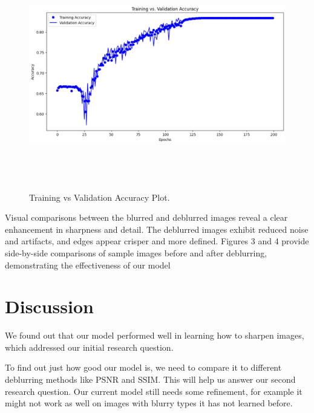 \documentclass[conference]{IEEEtran}
\begin{document}
\begin{figure}[t!]
\centering
\includegraphics[width=17cm,height=10cm]{Figures/Figure5.png}
\caption{Training vs Validation Accuracy Plot.}
\label{Fig:Figure5}
\end{figure}
Visual comparisons between the blurred and deblurred images reveal a clear enhancement in sharpness and detail.
The deblurred images exhibit reduced noise and artifacts, and edges appear crisper and more defined. Figures 3 and 4 provide side-by-side comparisons of sample images before and after deblurring, demonstrating the effectiveness of our model

\section{Discussion}

We found out that our model performed well in learning how to sharpen images, which addressed our initial research question. 

To find out just how good our model is, we need to compare it to different deblurring methods like PSNR and SSIM. This will help us answer our second research question.
Our current model still needs some refinement, for example it might not work as well on images with blurry types it has not learned before.
\end{document}
